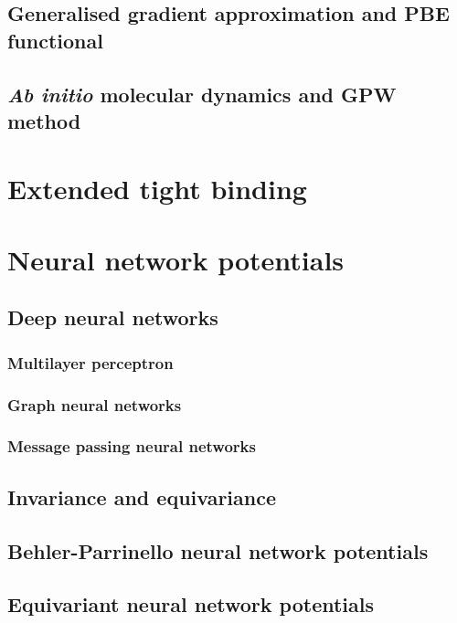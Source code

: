 \subsection{Generalised gradient approximation and PBE functional}

\subsection{\textit{Ab initio} molecular dynamics and GPW method}



\section{Extended tight binding}



\section{Neural network potentials}

\subsection{Deep neural networks}

\subsubsection{Multilayer perceptron}

\subsubsection{Graph neural networks}

\subsubsection{Message passing neural networks}

\subsection{Invariance and equivariance}

\subsection{Behler-Parrinello neural network potentials}

\subsection{Equivariant neural network potentials}